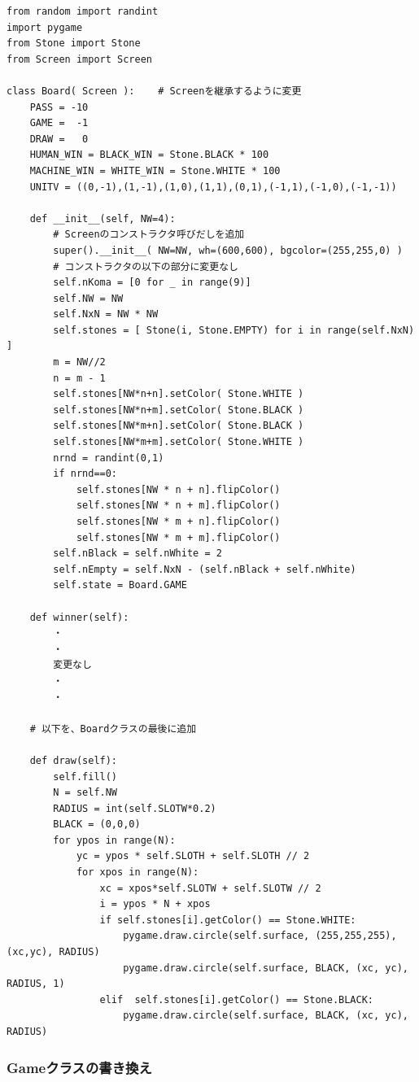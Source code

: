 \documentclass[uplatex,a4paper,11pt,oneside,openany]{jsbook}
\begin{document}
\begin{lstlisting}[caption=Board class,label=othello08]
from random import randint
import pygame
from Stone import Stone
from Screen import Screen

class Board( Screen ):    # Screenを継承するように変更
    PASS = -10
    GAME =  -1
    DRAW =   0
    HUMAN_WIN = BLACK_WIN = Stone.BLACK * 100
    MACHINE_WIN = WHITE_WIN = Stone.WHITE * 100
    UNITV = ((0,-1),(1,-1),(1,0),(1,1),(0,1),(-1,1),(-1,0),(-1,-1))

    def __init__(self, NW=4):
        # Screenのコンストラクタ呼びだしを追加
        super().__init__( NW=NW, wh=(600,600), bgcolor=(255,255,0) )
        # コンストラクタの以下の部分に変更なし
        self.nKoma = [0 for _ in range(9)]
        self.NW = NW
        self.NxN = NW * NW
        self.stones = [ Stone(i, Stone.EMPTY) for i in range(self.NxN) ]
        m = NW//2
        n = m - 1
        self.stones[NW*n+n].setColor( Stone.WHITE )
        self.stones[NW*n+m].setColor( Stone.BLACK )
        self.stones[NW*m+n].setColor( Stone.BLACK )
        self.stones[NW*m+m].setColor( Stone.WHITE )
        nrnd = randint(0,1)
        if nrnd==0:
            self.stones[NW * n + n].flipColor()
            self.stones[NW * n + m].flipColor()
            self.stones[NW * m + n].flipColor()
            self.stones[NW * m + m].flipColor()
        self.nBlack = self.nWhite = 2
        self.nEmpty = self.NxN - (self.nBlack + self.nWhite)
        self.state = Board.GAME

    def winner(self):
        ・
        ・
        変更なし
        ・
        ・

    # 以下を、Boardクラスの最後に追加

    def draw(self):
        self.fill()
        N = self.NW
        RADIUS = int(self.SLOTW*0.2)
        BLACK = (0,0,0)
        for ypos in range(N):
            yc = ypos * self.SLOTH + self.SLOTH // 2
            for xpos in range(N):
                xc = xpos*self.SLOTW + self.SLOTW // 2
                i = ypos * N + xpos
                if self.stones[i].getColor() == Stone.WHITE:
                    pygame.draw.circle(self.surface, (255,255,255), (xc,yc), RADIUS)
                    pygame.draw.circle(self.surface, BLACK, (xc, yc), RADIUS, 1)
                elif  self.stones[i].getColor() == Stone.BLACK:
                    pygame.draw.circle(self.surface, BLACK, (xc, yc), RADIUS)
\end{lstlisting}

\subsubsection{Gameクラスの書き換え}
\end{document}
